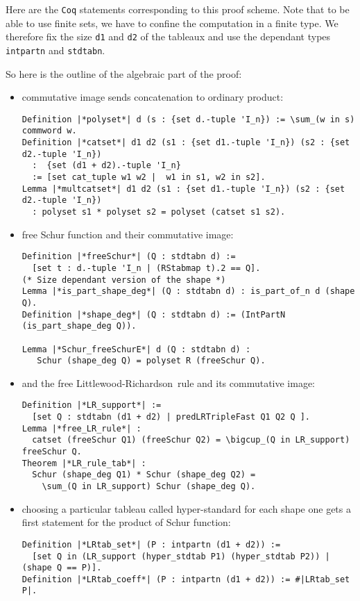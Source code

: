 \documentclass[12pt]{article}
\let\verb=\lstinline
\newcommand{\Coq}{\texttt{Coq}\xspace}
\newcommand{\LR}{Littlewood-Richardson\ }
\begin{document}
Here are the \Coq statements corresponding to this proof scheme. Note that to
be able to use finite sets, we have to confine the computation in a finite
type. We therefore fix the size \verb{d1} and \verb{d2} of the tableaux and
use the dependant types \verb{intpartn} and \verb{stdtabn}.

So here is the outline of the algebraic part of the proof:
\begin{itemize}
\item commutative image sends concatenation to ordinary product:
\begin{lstlisting}
Definition |*polyset*| d (s : {set d.-tuple 'I_n}) := \sum_(w in s) commword w.
Definition |*catset*| d1 d2 (s1 : {set d1.-tuple 'I_n}) (s2 : {set d2.-tuple 'I_n})
  :  {set (d1 + d2).-tuple 'I_n}
  := [set cat_tuple w1 w2 |  w1 in s1, w2 in s2].
Lemma |*multcatset*| d1 d2 (s1 : {set d1.-tuple 'I_n}) (s2 : {set d2.-tuple 'I_n}) 
  : polyset s1 * polyset s2 = polyset (catset s1 s2).
\end{lstlisting}
\item free Schur function and their commutative image:
\begin{lstlisting}
Definition |*freeSchur*| (Q : stdtabn d) :=
  [set t : d.-tuple 'I_n | (RStabmap t).2 == Q].
(* Size dependant version of the shape *)
Lemma |*is_part_shape_deg*| (Q : stdtabn d) : is_part_of_n d (shape Q).
Definition |*shape_deg*| (Q : stdtabn d) := (IntPartN (is_part_shape_deg Q)).

Lemma |*Schur_freeSchurE*| d (Q : stdtabn d) :
   Schur (shape_deg Q) = polyset R (freeSchur Q).
\end{lstlisting}
\item and the free \LR rule and its commutative image:
\begin{lstlisting}
Definition |*LR_support*| :=
  [set Q : stdtabn (d1 + d2) | predLRTripleFast Q1 Q2 Q ].
Lemma |*free_LR_rule*| :
  catset (freeSchur Q1) (freeSchur Q2) = \bigcup_(Q in LR_support) freeSchur Q.
Theorem |*LR_rule_tab*| :
  Schur (shape_deg Q1) * Schur (shape_deg Q2) =
    \sum_(Q in LR_support) Schur (shape_deg Q).
\end{lstlisting}
\item choosing a particular tableau called hyper-standard for each shape
  one gets a first statement for the product of Schur function:
\begin{lstlisting}
Definition |*LRtab_set*| (P : intpartn (d1 + d2)) :=
  [set Q in (LR_support (hyper_stdtab P1) (hyper_stdtab P2)) | (shape Q == P)].
Definition |*LRtab_coeff*| (P : intpartn (d1 + d2)) := #|LRtab_set P|.


\end{lstlisting}
\end{itemize}
\end{document}
